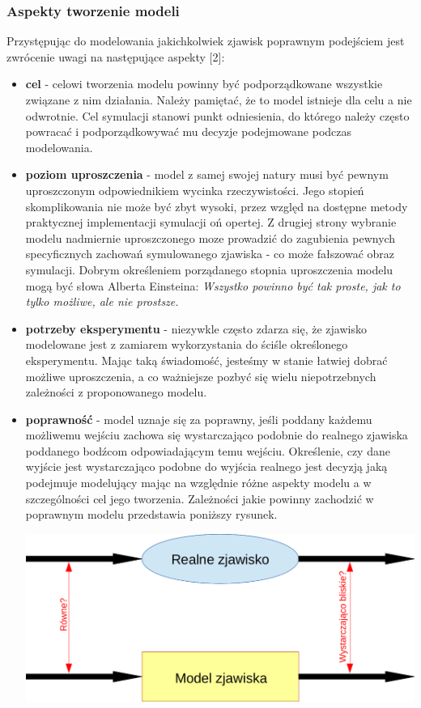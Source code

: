 \subsubsection{Aspekty tworzenie modeli}
\par{
Przystępując do modelowania jakichkolwiek zjawisk poprawnym podejściem jest zwrócenie uwagi na następujące aspekty [2]:
\begin{itemize}
\item \textbf{cel} - celowi tworzenia modelu powinny być podporządkowane wszystkie związane z nim działania. Należy pamiętać, że to model istnieje dla celu a nie odwrotnie. Cel symulacji stanowi punkt odniesienia, do którego należy często powracać i podporządkowywać mu decyzje podejmowane podczas modelowania.
\item \textbf{poziom uproszczenia} - model z samej swojej natury musi być pewnym uproszczonym odpowiednikiem wycinka rzeczywistości. Jego stopień skomplikowania nie może być zbyt wysoki, przez względ na dostępne metody praktycznej implementacji symulacji oń opertej. Z drugiej strony wybranie modelu nadmiernie uproszczonego moze prowadzić do zagubienia pewnych specyficznych zachowań symulowanego zjawiska - co może fałszować obraz symulacji. Dobrym określeniem porządanego stopnia uproszczenia modelu mogą być słowa Alberta Einsteina: \textit{Wszys­tko po­win­no być tak pros­te, jak to tyl­ko możli­we, ale nie pros­tsze.}
\item \textbf{potrzeby eksperymentu} - niezywkle często zdarza się, że zjawisko modelowane jest z zamiarem wykorzystania do ściśle określonego eksperymentu. Mając taką świadomość, jesteśmy w stanie łatwiej dobrać możliwe uproszczenia, a co ważniejsze pozbyć się wielu niepotrzebnych zależności z proponowanego modelu.
\item \textbf{poprawność} - model uznaje się za poprawny, jeśli poddany każdemu możliwemu wejściu zachowa się wystarczająco podobnie do realnego zjawiska poddanego bodźcom odpowiadającym temu wejściu. Określenie, czy dane wyjście jest wystarczająco podobne do wyjścia realnego jest decyzją jaką podejmuje modelujący mając na względnie różne aspekty modelu a w szczególności cel jego tworzenia. Zależności jakie powinny zachodzić w poprawnym modelu przedstawia poniższy rysunek.
\par{
\begin{center}
\includegraphics[width=\textwidth,keepaspectratio]{img/poprawnosc_modelu}

\end{center}}
\end{itemize}}
